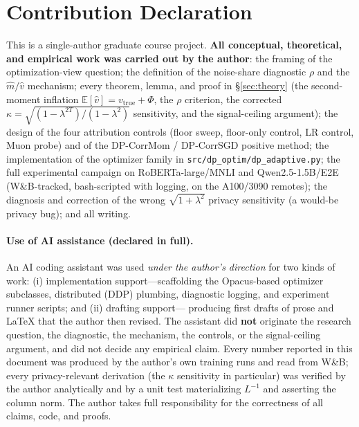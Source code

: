 \documentclass[11pt]{article}
\newcommand{\E}{\mathbb{E}}
\theoremstyle{plain}
\theoremstyle{definition}
\theoremstyle{remark}
\begin{document}
\section{Contribution Declaration}
\label{sec:contrib}

This is a single-author graduate course project. \textbf{All conceptual, theoretical, and
empirical work was carried out by the author}: the framing of the optimization-view question; the
definition of the noise-share diagnostic $\rho$ and the $\hat m/\hat v$ mechanism; every
theorem, lemma, and proof in \S\ref{sec:theory} (the second-moment inflation
$\E[\hat v]=v_{\mathrm{true}}+\Phi$, the $\rho$ criterion, the corrected
$\kappa=\sqrt{(1-\lambda^{2T})/(1-\lambda^2)}$ sensitivity, and the signal-ceiling argument); the
design of the four attribution controls (floor sweep, floor-only control, LR control, Muon probe)
and of the DP-CorrMom / DP-CorrSGD positive method; the implementation of the optimizer family in
\texttt{src/dp\_optim/dp\_adaptive.py}; the full experimental campaign on RoBERTa-large/MNLI and
Qwen2.5-1.5B/E2E (W\&B-tracked, bash-scripted with logging, on the A100/3090 remotes); the
diagnosis and correction of the wrong $\sqrt{1+\lambda^2}$ privacy sensitivity (a would-be
privacy bug); and all writing.

\paragraph{Use of AI assistance (declared in full).}
An AI coding assistant was used \emph{under the author's direction} for two kinds of work:
(i) implementation support---scaffolding the Opacus-based optimizer subclasses, distributed
(DDP) plumbing, diagnostic logging, and experiment runner scripts; and (ii) drafting support---
producing first drafts of prose and \LaTeX{} that the author then revised. The assistant did
\textbf{not} originate the research question, the diagnostic, the mechanism, the controls, or the
signal-ceiling argument, and did not decide any empirical claim. Every number reported in this
document was produced by the author's own training runs and read from W\&B; every privacy-relevant
derivation (the $\kappa$ sensitivity in particular) was verified by the author analytically and by
a unit test materializing $L^{-1}$ and asserting the column norm. The author takes full
responsibility for the correctness of all claims, code, and proofs.
\end{document}
